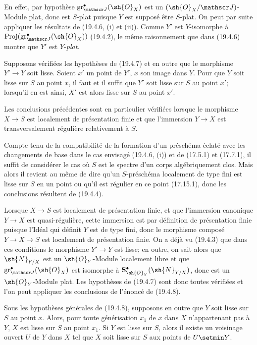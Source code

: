 En effet, par hypothèse $\operatorname{gr}_{\mathscr J}^\bullet(\sh{O}_X)$ est un $(\sh{O}_X/\mathscr J)$-Module plat, donc est $S$-plat puisque $Y$ est supposé être $S$-plat. On peut par suite appliquer les résultats de (19.4.6, (i) et (ii)). Comme $Y'$ est $Y$-isomorphe à $\operatorname{Proj}(\operatorname{gr}_{\mathscr J}^\bullet(\sh{O}_X))$ (19.4.2), le même raisonnement que dans (19.4.6) montre que $Y'$ est $Y$-\emph{plat}.

\begin{proposition}[19.4.8]
\label{IV.19.4.8}
Supposons vérifiées les hypothèses de \textup{(19.4.7)} et en outre que le morphisme $Y'\to Y$ soit lisse. Soient $x'$ un point de $Y'$, $x$ son image dans $Y$. Pour que $Y$ soit lisse sur $S$ au point $x$, il faut et il suffit que $Y'$ soit lisse sur $S$ au point $x'$; lorsqu'il en est ainsi, $X'$ est alors lisse sur $S$ au point $x'$.

Les conclusions précédentes sont en particulier vérifiées lorsque le morphisme $X\to S$ est localement de présentation finie et que l'immersion $Y\to X$ est transversalement régulière relativement à $S$.
\end{proposition}

Compte tenu de la compatibilité de la formation d'un préschéma éclaté avec les changements de base dans le cas envisagé (19.4.6, (i)) et de (17.5.1) et (17.7.1),
il suffit de considérer le cas où $S$ est le spectre d'un corps algébriquement clos. Mais alors il revient au même de dire qu'un $S$-préschéma localement de type fini est lisse sur $S$ en un point ou qu'il est régulier en ce point (17.15.1), donc les conclusions résultent de (19.4.4).

Lorsque $X\to S$ est localement de présentation finie, et que l'immersion canonique $Y\to X$ est quasi-régulière, cette immersion est par définition de présentation finie puisque l'Idéal qui définit $Y$ est de type fini, donc le morphisme composé $Y\to X\to S$ est localement de présentation finie. On a déjà vu (19.4.3) que dans ces conditions le morphisme $Y'\to Y$ est lisse; en outre, on sait alors que $\sh{N}_{Y/X}$ est un $\sh{O}_Y$-Module localement libre et que $\operatorname{gr}_{\mathscr J}^\bullet(\sh{O}_X)$ est isomorphe à $\mathbf S_{\sh{O}_Y}^\bullet(\sh{N}_{Y/X})$, donc est un $\sh{O}_Y$-Module plat. Les hypothèses de (19.4.7) sont donc toutes vérifiées et l'on peut appliquer les conclusions de l'énoncé de (19.4.8).

\begin{corollary}[19.4.9]
\label{IV.19.4.9}
Sous les hypothèses générales de \textup{(19.4.8)}, supposons en outre que $Y$ soit lisse sur $S$ au point $x$. Alors, pour toute générisation $x_1$ de $x$ dans $X$ n'appartenant pas à $Y$, $X$ est lisse sur $S$ au point $x_1$. Si $Y$ est lisse sur $S$, alors il existe un voisinage ouvert $U$ de $Y$ dans $X$ tel que $X$ soit lisse sur $S$ aux points de $U\setmin Y$.
\end{corollary}

